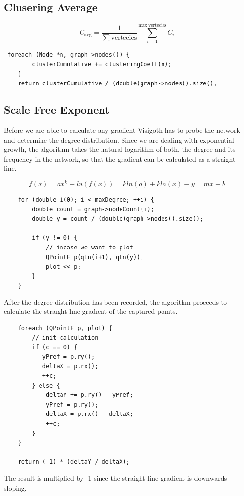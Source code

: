 \documentclass[a4paper,11pt,titlepage]{article}
\begin{document}
\subsection{Clusering Average}
\[
C_\mathrm{avg} = \frac{1}{\mathrm{\sum vertecies}}\sum_{i=1}^{\mathrm{max\
vertecies}} C_i
\]
\begin{lstlisting}
 foreach (Node *n, graph->nodes()) {
        clusterCumulative += clusteringCoeff(n);
    }
    return clusterCumulative / (double)graph->nodes().size();
\end{lstlisting}

\subsection{Scale Free Exponent}

Before we are able to calculate any gradient Visigoth has to probe the network
and determine the degree distribution. Since we are dealing with exponential
growth, the algorithm takes the natural logarithm of both, the degree and its
frequency in the network, so that the gradient can be calculated as a straight
line.

\[
f(x) = ax^k \equiv ln(f(x)) = kln(a) + kln(x) \equiv y = mx + b
\]

\begin{lstlisting}
    for (double i(0); i < maxDegree; ++i) {
        double count = graph->nodeCount(i);
        double y = count / (double)graph->nodes().size();

        if (y != 0) {
            // incase we want to plot
            QPointF p(qLn(i+1), qLn(y));
            plot << p;
        }
    }
\end{lstlisting}

After the degree distribution has been recorded, the algorithm proceeds to
calculate the straight line gradient of the captured points.

\begin{lstlisting}
    foreach (QPointF p, plot) {
        // init calculation
        if (c == 0) {
           yPref = p.ry();
           deltaX = p.rx();
           ++c;
        } else {
            deltaY += p.ry() - yPref;
            yPref = p.ry();
            deltaX = p.rx() - deltaX;
            ++c;
        }
    }

    return (-1) * (deltaY / deltaX);
\end{lstlisting}

The result is multiplied by -1 since the straight line gradient is downwards
sloping.
\end{document}
